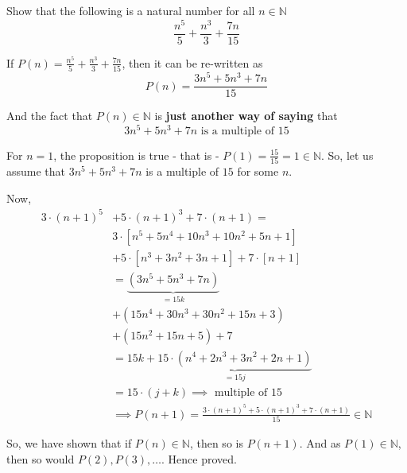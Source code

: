 
\question[4] Show that the following is a natural number for all $n\in\mathbb{N}$
  \[ \frac{n^5}{5} + \frac{n^3}{3} + \frac{7n}{15} \]

\insertQR{}

\begin{solution}[\fullpage]
  If $P(n) = \frac{n^5}{5} + \frac{n^3}{3} + \frac{7n}{15}$, then it can be re-written as 
  \[ P(n) = \frac{3n^5 + 5n^3 + 7n}{15} \]

  And the fact that $P(n)\in\mathbb{N}$ is \textbf{just another way of saying} that 
  \[ 3n^5 + 5n^3 + 7n \text{ is a multiple of } 15 \]

  For $n=1$, the proposition is true - that is - $P(1)=\frac{15}{15} = 1\in\mathbb{N}$. 
  So, let us assume that $3n^5+5n^3+7n$ is a multiple of $15$ for some $n$. 

  Now,
  \begin{align}
    3\cdot (n+1)^5 &+ 5\cdot (n+1)^3 + 7\cdot (n+1) = \nonumber \\
    & 3\cdot\left[ n^5 + 5n^4 + 10n^3 + 10n^2 + 5n + 1 \right] \nonumber \\ 
    &+ 5\cdot\left[ n^3+3n^2+3n+ 1 \right] + 7\cdot\left[ n + 1\right] \\
    &= \underbrace{(3n^5 + 5n^3 + 7n)}_{= 15k} \nonumber \\
    &+ (15n^4 + 30n^3 + 30n^2 + 15n + 3) \nonumber \\
    &+ (15n^2 + 15n + 5) + 7 \\
    &= 15k + \underbrace{15\cdot ( n^4 + 2n^3 + 3n^2 + 2n + 1)}_{= 15j } \\
    &= 15\cdot (j + k)\implies\text{ multiple of } 15  \\
    &\implies P(n+1) = \frac{3\cdot(n+1)^5 + 5\cdot(n+1)^3 + 7\cdot(n+1)}{15}\in\mathbb{N}
  \end{align} 

  So, we have shown that if $P(n)\in\mathbb{N}$, then so is $P(n+1)$. And as $P(1)\in\mathbb{N}$, 
  then so would $P(2), P(3),\ldots$. Hence proved.
\end{solution}

